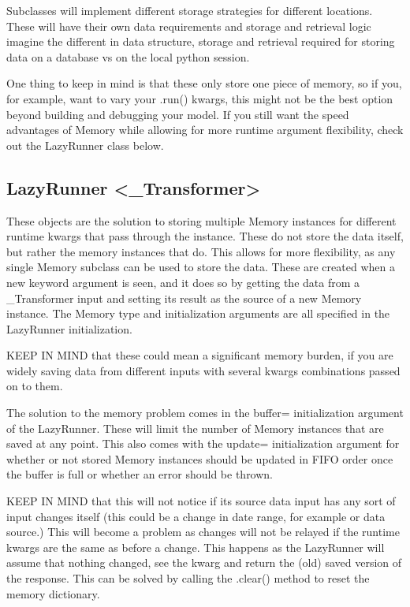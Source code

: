 \documentclass[letterpaper,10pt,english]{sphinxmanual}
\begin{document}
Subclasses will implement different storage strategies for different locations. These will have their own data requirements and storage and retrieval logic \sphinxhyphen{} imagine the different in data structure, storage and retrieval required for storing data on a database vs on the local python session.

One thing to keep in mind is that these only store one piece of memory, so if you, for example, want to vary your .run() kwargs, this might not be the best option beyond building and debugging your model. If you still want the speed advantages of Memory while allowing for more runtime argument flexibility, check out the LazyRunner class below.


\subsection{LazyRunner \textless{}\_Transformer\textgreater{}}
\label{\detokenize{beginners-guide:lazyrunner-transformer}}
These objects are the solution to storing multiple Memory instances for different runtime kwargs that pass through the instance. These do not store the data itself, but rather the memory instances that do. This allows for more flexibility, as any single Memory subclass can be used to store the data. These are created when a new keyword argument is seen, and it does so by getting the data from a \_Transformer input and setting its result as the source of a new Memory instance. The Memory type and initialization arguments are all specified in the LazyRunner initialization.

KEEP IN MIND that these could mean a significant memory burden, if you are widely saving data from different inputs with several kwargs combinations passed on to them.

The solution to the memory problem comes in the buffer= initialization argument of the LazyRunner. These will limit the number of Memory instances that are saved at any point. This also comes with the update= initialization argument for whether or not stored Memory instances should be updated in FIFO order once the buffer is full or whether an error should be thrown.

KEEP IN MIND that this will not notice if its source data input has any sort of input changes itself (this could be a change in date range, for example or data source.) This will become a problem as changes will not be relayed if the runtime kwargs are the same as before a change. This happens as the LazyRunner will assume that nothing changed, see the kwarg and return the (old) saved version of the response. This can be solved by calling the .clear() method to reset the memory dictionary.
\end{document}
